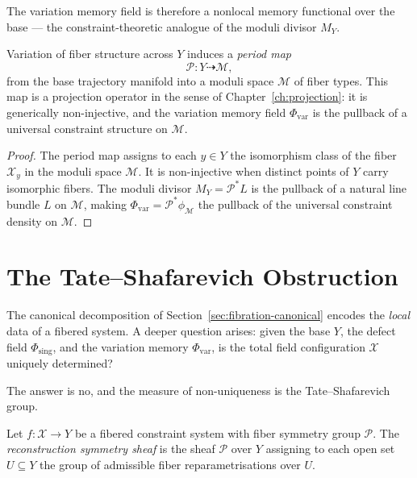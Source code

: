 \documentclass[11pt,openany]{book}
\begin{document}
The variation memory field is therefore a nonlocal
memory functional over the base --- the constraint-theoretic
analogue of the moduli divisor $M_Y$.

\begin{proposition}
\label{prop:period-map}
Variation of fiber structure across $Y$ induces a
\emph{period map}
\[
  \mathcal{P} : Y \dashrightarrow \mathcal{M},
\]
from the base trajectory manifold into a moduli space
$\mathcal{M}$ of fiber types.  This map is a projection
operator in the sense of Chapter~\ref{ch:projection}: it
is generically non-injective, and the variation memory
field $\Phi_{\mathrm{var}}$ is the pullback of a universal
constraint structure on $\mathcal{M}$.
\end{proposition}

\begin{proof}
The period map assigns to each $y \in Y$ the
isomorphism class of the fiber $\mathcal{X}_y$ in the
moduli space $\mathcal{M}$.  It is non-injective when
distinct points of $Y$ carry isomorphic fibers.
The moduli divisor $M_Y = \mathcal{P}^* L$ is the
pullback of a natural line bundle $L$ on $\mathcal{M}$,
making $\Phi_{\mathrm{var}} = \mathcal{P}^* \phi_{\mathcal{M}}$
the pullback of the universal constraint density on
$\mathcal{M}$.
\end{proof}

\section{The Tate--Shafarevich Obstruction}
\label{sec:tate-shafarevich}

The canonical decomposition of Section~\ref{sec:fibration-canonical}
encodes the \emph{local} data of a fibered system.  A
deeper question arises: given the base $Y$, the defect
field $\Phi_{\mathrm{sing}}$, and the variation memory
$\Phi_{\mathrm{var}}$, is the total field configuration
$\mathcal{X}$ uniquely determined?

The answer is no, and the measure of non-uniqueness is the
Tate--Shafarevich group.

\begin{definition}
\label{def:reconstruction-symmetry}
Let $f : \mathcal{X} \to Y$ be a fibered constraint system
with fiber symmetry group $\mathcal{P}$.  The
\emph{reconstruction symmetry sheaf} is the sheaf
$\mathcal{P}$ over $Y$ assigning to each open set
$U \subseteq Y$ the group of admissible fiber
reparametrisations over $U$.
\end{definition}
\end{document}
